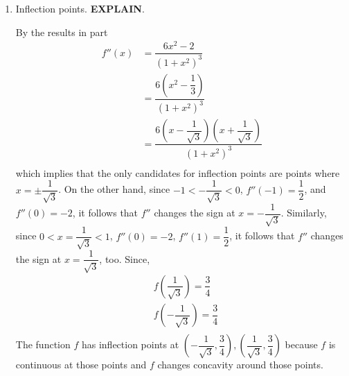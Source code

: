 \documentclass{ximera}
\begin{document}
\begin{problem}
\begin{enumerate}
	\item  Inflection points. \textbf{EXPLAIN}.
\begin{explanation}
		By the results in part 
		\begin{align*}
 		f''(x) &= \dfrac{6x^2 - 2}{(1+x^2)^3}\\
		 &= \dfrac{6(x^2 - \dfrac{1}{3})}{(1+x^2)^3}\\
		 &= \dfrac{6(x - \dfrac{1}{\sqrt{3}})(x + \dfrac{1}{\sqrt{3}})}{(1+x^2)^3}\\
		\end{align*}
		  which implies that the only candidates for inflection points are points where $x=\pm\dfrac{1}{\sqrt{3}}$.
		On the other hand, since $-1<- \dfrac{1}{\sqrt{3}}<0$, $f''(-1)=\dfrac{1}{2}$, and $f''(0)=-2$, it follows that $f''$ changes the sign at  $x=-\dfrac{1}{\sqrt{3}}$. Similarly, since $0<x=\dfrac{1}{\sqrt{3}}<1$, $f''(0)=-2$, $f''(1)=\dfrac{1}{2}$, it follows that $f''$ changes the sign at  $x=\dfrac{1}{\sqrt{3}}$, too.
		Since,
		\begin{align*}
 		 & f\left( \dfrac{1}{\sqrt{3}} \right)=\dfrac{3}{4} \\ 
 		& f\left( -\dfrac{1}{\sqrt{3}} \right)=\dfrac{3}{4} \\ 
		\end{align*}  
		The function $f$ has inflection points at $\left( -\dfrac{1}{\sqrt{3}},\dfrac{3}{4} \right),\left( \dfrac{1}{\sqrt{3}},\dfrac{3}{4} \right)$ because $f$ is continuous at those points and $f$ changes concavity around those points.
		\end{explanation}
		
	\end{enumerate}
		
\end{problem}
\end{document}
